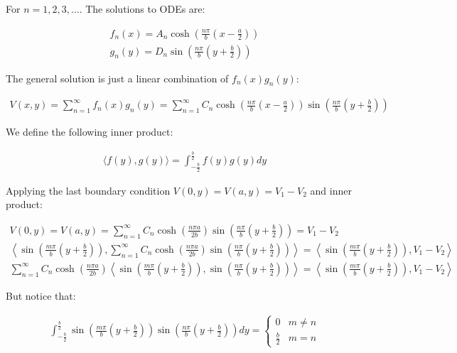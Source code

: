 \documentclass[12pt, a4paper]{article}
\begin{document}
For $n=1,2,3,\dots$. The solutions to ODEs are:

\begin{gather}
f_n(x)=A_n\cosh\left(\frac{n\pi}{b}\left(x-\frac{a}{2}\right)\right) \\
g_n(y)=D_n\sin\left(\frac{n\pi}{b}\left(y+\frac{b}{2}\right)\right)
\end{gather}

The general solution is just a linear combination of $f_n (x) g_n (y)$:

\begin{gather}
V(x,y)=\sum_{n=1}^\infty f_n (x) g_n (y) = \sum_{n=1}^\infty C_n \cosh\left(\frac{n\pi}{b}\left(x-\frac{a}{2}\right)\right) \sin\left(\frac{n\pi}{b}\left(y+\frac{b}{2}\right)\right)
\end{gather}

We define the following inner product:

\begin{gather}
\langle f(y), g(y) \rangle = \int_{-\frac{b}{2}}^{\frac{b}{2}} f(y) g(y) dy
\end{gather}

Applying the last boundary condition $V(0,y)=V(a,y)=V_1-V_2$ and inner product:

\begin{gather}
V(0,y) = V(a,y) = \sum_{n=1}^\infty C_n \cosh\left(\frac{n\pi a}{2b}\right) \sin\left(\frac{n\pi}{b}\left(y+\frac{b}{2}\right)\right)=V_1-V_2 \\
\left\langle \sin\left(\frac{m\pi}{b}\left(y+\frac{b}{2}\right)\right), \sum_{n=1}^\infty C_n \cosh\left(\frac{n\pi a}{2b}\right) \sin\left(\frac{n\pi}{b}\left(y+\frac{b}{2}\right)\right) \right\rangle = \left\langle \sin\left(\frac{m\pi}{b}\left(y+\frac{b}{2}\right)\right), V_1-V_2 \right\rangle \\
\sum_{n=1}^\infty C_n \cosh\left(\frac{n\pi a}{2b}\right) \left\langle \sin\left(\frac{m\pi}{b}\left(y+\frac{b}{2}\right)\right), \sin\left(\frac{n\pi}{b}\left(y+\frac{b}{2}\right)\right) \right\rangle = \left\langle \sin\left(\frac{m\pi}{b}\left(y+\frac{b}{2}\right)\right), V_1-V_2 \right\rangle
\end{gather}

But notice that:

\begin{gather}
\int_{-\frac{b}{2}}^{\frac{b}{2}} \sin\left(\frac{m\pi}{b}\left(y+\frac{b}{2}\right)\right) \sin\left(\frac{n\pi}{b}\left(y+\frac{b}{2}\right)\right) dy = \begin{cases} 0 & m \ne n \\ \frac{b}{2} & m=n \end{cases}
\end{gather}
\end{document}
